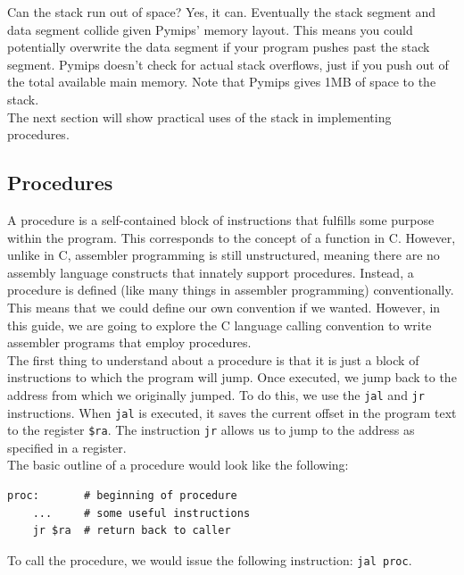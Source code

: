 \documentclass[12pt]{article}
\begin{document}
Can the stack run out of space? Yes, it can. Eventually the stack segment and
     data segment collide given Pymips' memory layout. This means you could
     potentially overwrite the data segment if your program pushes past the
     stack segment. Pymips doesn't check for actual stack overflows, just if you
     push out of the total available main memory. Note that Pymips gives 1MB of
     space to the stack.\\

The next section will show practical uses of the stack in implementing
     procedures.

\subsection{Procedures}
\label{sec:proc}

A procedure is a self-contained block of instructions that fulfills some purpose
     within the program. This corresponds to the concept of a function in
     C. However, unlike in C, assembler programming is still unstructured,
     meaning there are no assembly language constructs that innately support
     procedures. Instead, a procedure is defined (like many things in assembler
     programming) conventionally. This means that we could define our own
     convention if we wanted. However, in this guide, we are going to explore
     the C language calling convention to write assembler programs that employ
     procedures.\\

The first thing to understand about a procedure is that it is just a block of
     instructions to which the program will jump. Once executed, we jump back to
     the address from which we originally jumped. To do this, we use the
     \texttt{jal} and \texttt{jr} instructions. When \texttt{jal} is executed,
     it saves the current offset in the program text to the register
     \texttt{\$ra}. The instruction \texttt{jr} allows us to jump to the address
     as specified in a register.\\

The basic outline of a procedure would look like the following:\\
\begin{lstlisting}
proc:       # beginning of procedure
    ...     # some useful instructions
    jr $ra  # return back to caller
\end{lstlisting}

To call the procedure, we would issue the following instruction: \texttt{jal
     proc}.\\
\end{document}
